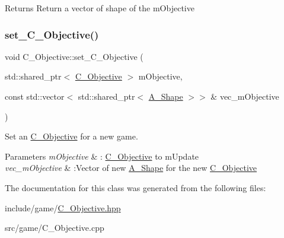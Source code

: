 \begin{DoxyReturn}{Returns}
Return a vector of shape of the mObjective
\end{DoxyReturn}
\mbox{\label{classObjective_adecebbf5e11f3e778b1b7f48735a0765}} 
\subsubsection{\texorpdfstring{set\+\_\+\+C_Objective()}{set\_Objective()}}
{\footnotesize\ttfamily void C_Objective\+::set\+\_\+\+C_Objective (\begin{DoxyParamCaption}\item[{std\+::shared\+\_\+ptr$<$ \hyperlink{classObjective}{C_Objective} $>$}]{mObjective,  }\item[{const std\+::vector$<$ std\+::shared\+\_\+ptr$<$ \hyperlink{classShape}{A_Shape} $>$$>$ \&}]{vec\+\_\+mObjective }\end{DoxyParamCaption})\hspace{0.3cm}{\ttfamily [static]}}



Set an \hyperlink{classObjective}{C_Objective} for a new game.


\begin{DoxyParams}{Parameters}
{\em mObjective} & \+: \hyperlink{classObjective}{C_Objective} to mUpdate \\
\hline
{\em vec\+\_\+mObjective} & \+:Vector of new \hyperlink{classShape}{A_Shape} for the new \hyperlink{classObjective}{C_Objective} \\
\hline
\end{DoxyParams}


The documentation for this class was generated from the following files\+:\begin{DoxyCompactItemize}
\item 
include/game/\hyperlink{Objective_8hpp}{C_Objective.\+hpp}\item
src/game/C_Objective.\+cpp\end{DoxyCompactItemize}
